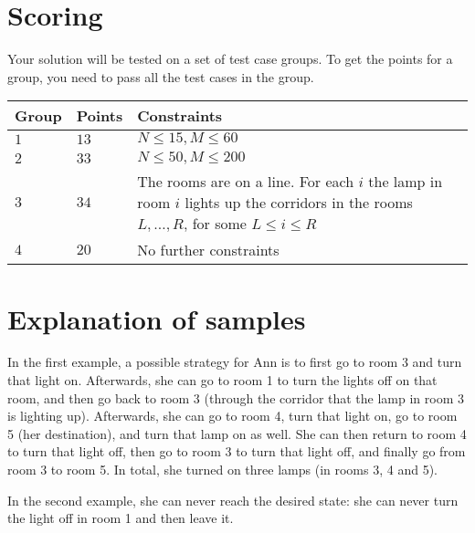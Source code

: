 \section*{Scoring}
Your solution will be tested on a set of test case groups.
To get the points for a group, you need to pass all the test cases in the group.

\noindent
\begin{tabular}{| l | l | p{10cm} |}
\hline
Group & Points & Constraints \\ \hline
$1$   & $13$       & $N \le 15, M \le 60$ \\ \hline
$2$   & $33$       & $N \le 50, M \le 200$ \\ \hline
$3$   & $34$       & The rooms are on a line. For each $i$ the lamp in room $i$ lights up the corridors in the rooms $L, \dots, R$, for some $L \le i \le R$ \\ \hline
$4$   & $20$       & No further constraints \\ \hline
\end{tabular}

\section*{Explanation of samples}
In the first example, a possible strategy for Ann is to first go to room 3 and turn that light on.
Afterwards, she can go to room 1 to turn the lights off on that room, and then go back to room 3 (through the corridor that the lamp in room 3 is lighting up).
Afterwards, she can go to room 4, turn that light on, go to room 5 (her destination), and turn that lamp on as well.
She can then return to room 4 to turn that light off, then go to room 3 to turn that light off, and finally go from room 3 to room 5.
In total, she turned on three lamps (in rooms 3, 4 and 5).

In the second example, she can never reach the desired state: she can never turn the light off in room 1 and then leave it.
